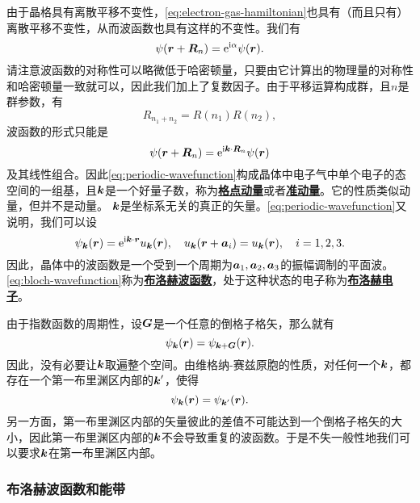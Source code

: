 \documentclass[hyperref, UTF8, a4paper]{ctexart}
\newcommand*{\ii}{\mathrm{i}}
\newcommand*{\ee}{\mathrm{e}}
\newcommand*{\concept}[1]{\underline{\textbf{#1}}}
\begin{document}
由于晶格具有离散平移不变性，\eqref{eq:electron-gas-hamiltonian}也具有（而且只有）离散平移不变性，从而波函数也具有这样的不变性。我们有
\[
    \psi(\vb*{r}+\vb*{R}_n) = \ee^{\ii \alpha} \psi(\vb*{r}).
\]
请注意波函数的对称性可以略微低于哈密顿量，只要由它计算出的物理量的对称性和哈密顿量一致就可以，因此我们加上了复数因子。由于平移运算构成群，且$n$是群参数，有
\[
    R_{n_1+n_2} = R(n_1) R(n_2),
\]
波函数的形式只能是
\begin{equation}
    \psi(\vb*{r}+\vb*{R}_n) = \ee^{\ii \vb*{k} \cdot \vb*{R}_n} \psi(\vb*{r})
    \label{eq:periodic-wavefunction}
\end{equation}
及其线性组合。因此\eqref{eq:periodic-wavefunction}构成晶体中电子气中单个电子的态空间的一组基，且$\vb*{k}$是一个好量子数，称为\concept{格点动量}或者\concept{准动量}。它的性质类似动量，但并不是动量。
$\vb*{k}$是坐标系无关的真正的矢量。\eqref{eq:periodic-wavefunction}又说明，我们可以设
\begin{equation}
    \psi_{\vb*{k}}(\vb*{r}) = \ee^{\ii \vb*{k} \cdot \vb*{r}} u_{\vb*{k}}(\vb*{r}), \quad u_{\vb*{k}}(\vb*{r}+\vb*{a}_i) = u_{\vb*{k}}(\vb*{r}), \quad i = 1, 2, 3.
    \label{eq:bloch-wavefunction}
\end{equation}
因此，晶体中的波函数是一个受到一个周期为$\vb*{a}_1,\vb*{a}_2, \vb*{a}_3$的振幅调制的平面波。
\eqref{eq:bloch-wavefunction}称为\concept{布洛赫波函数}，处于这种状态的电子称为\concept{布洛赫电子}。

由于指数函数的周期性，设$\vb*{G}$是一个任意的倒格子格矢，那么就有
\[
    \psi_{\vb*{k}}(\vb*{r}) = \psi_{\vb*{k}+\vb*{G}}(\vb*{r}).
\]
因此，没有必要让$\vb*{k}$取遍整个空间。由维格纳-赛兹原胞的性质，对任何一个$\vb*{k}$，都存在一个第一布里渊区内部的$\vb*{k}'$，使得
\[
    \psi_{\vb*{k}}(\vb*{r}) = \psi_{\vb*{k}'}(\vb*{r}).
\]
另一方面，第一布里渊区内部的矢量彼此的差值不可能达到一个倒格子格矢的大小，因此第一布里渊区内部的$\vb*{k}$不会导致重复的波函数。于是不失一般性地我们可以要求$\vb*{k}$在第一布里渊区内部。

\subsubsection{布洛赫波函数和能带}
\end{document}
